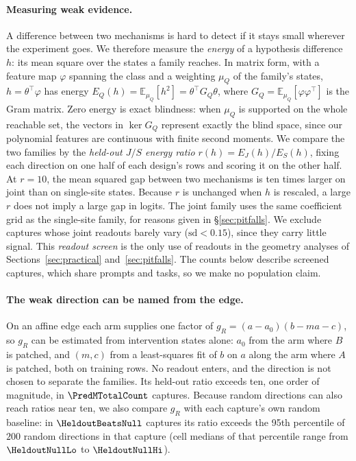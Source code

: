 \documentclass{article}
\theoremstyle{plain}
\theoremstyle{definition}
\begin{document}
\paragraph{Measuring weak evidence.} A difference between two mechanisms is hard to detect if it stays small wherever
the experiment goes. We therefore measure the \emph{energy} of a hypothesis difference $h$: its mean square over the
states a family reaches. In matrix form, with a feature map $\varphi$ spanning the class and a weighting $\mu_Q$ of the
family's states, $h=\theta^\top\varphi$ has energy $E_Q(h)=\mathbb E_{\mu_Q}[h^2]=\theta^\top G_Q\theta$, where
$G_Q=\mathbb E_{\mu_Q}[\varphi\varphi^\top]$ is the Gram matrix. Zero energy is exact blindness: when $\mu_Q$ is
supported on the whole reachable set, the vectors in $\ker G_Q$ represent exactly the blind space, since our polynomial
features are continuous with finite second moments. We compare the two families by the \emph{held-out $J/S$ energy
ratio} $r(h)=E_J(h)/E_S(h)$, fixing each direction on one half of each design's rows and scoring it on the other half.
At $r=10$, the mean squared gap between two mechanisms is ten times larger on joint than on single-site states. Because
$r$ is unchanged when $h$ is rescaled, a large $r$ does not imply a large gap in logits. The joint family uses the same
coefficient grid as the single-site family, for reasons given in \S\ref{sec:pitfalls}. We exclude captures whose joint
readouts barely vary ($\mathrm{sd}<0.15$), since they carry little signal. This \emph{readout screen} is the only use of
readouts in the geometry analyses of Sections~\ref{sec:practical} and~\ref{sec:pitfalls}. The counts below describe
screened captures, which share prompts and tasks, so we make no population claim.

\paragraph{The weak direction can be named from the edge.}
\label{sec:predict}
On an affine edge each arm supplies one factor of $g_R=(a-a_0)(b-ma-c)$, so $g_R$ can be estimated from intervention
states alone: $a_0$ from the arm where $B$ is patched, and $(m,c)$ from a least-squares fit of $b$ on $a$ along the arm
where $A$ is patched, both on training rows. No readout enters, and the direction is not chosen to separate the
families. Its held-out ratio exceeds ten, one order of magnitude, in $\PredMTotalCount$ captures. Because random
directions can also reach ratios near ten, we also compare $g_R$ with each capture's own random baseline: in
$\HeldoutBeatsNull$ captures its ratio exceeds the 95th percentile of $200$ random directions in that capture (cell
medians of that percentile range from $\HeldoutNullLo$ to $\HeldoutNullHi$).
\end{document}
